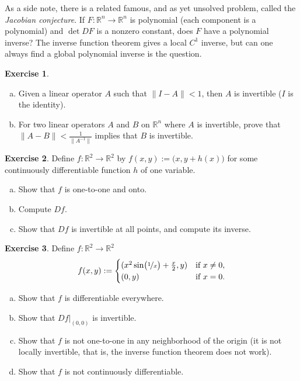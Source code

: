 \documentclass[12pt,openany]{book}
\newcommand{\snorm}[1]{\lVert {#1} \rVert}
\newcommand{\R}{{\mathbb{R}}}
\newcommand{\myindex}[1]{#1\index{#1}}
\theoremstyle{plain}
\theoremstyle{remark}
\theoremstyle{definition}
\newenvironment{exbox}{%
    \def\FrameCommand{\vrule width 1pt \relax\hspace {10pt}}%
    \MakeFramed {\advance \hsize -\width \FrameRestore }%
}{%
    \endMakeFramed
}
\newenvironment{exparts}{%
    \leavevmode\begin{enumerate}[a),noitemsep,topsep=0pt,parsep=0pt,partopsep=0pt]
}{%
    \end{enumerate}
}
\theoremstyle{exercise}
\newtheorem{exercise}{Exercise}[section]
\theoremstyle{example}
\begin{document}
\medskip

As a side note, there is a related famous, and as yet unsolved problem,
called the \emph{\myindex{Jacobian conjecture}}.  If $F \colon \R^n \to
\R^n$ is polynomial (each component is a polynomial) and $\det DF$ is a nonzero
constant, does $F$ have a polynomial inverse?
The inverse function theorem gives a local $C^1$ inverse, but can one always
find a global polynomial inverse is the question.

\begin{exbox}
\begin{exercise}
\begin{exparts}
\item
Given a linear operator $A$ such that
$\snorm{I-A} < 1$, then $A$ is invertible ($I$ is the identity).
\item
For two linear operators $A$ and $B$ on $\R^n$ where $A$ is invertible,
prove that $\snorm{A-B} < \frac{1}{\snorm{A^{-1}}}$ implies that $B$ is
invertible.
\end{exparts}
\end{exercise}

\begin{exercise}
Define $f \colon \R^2 \to \R^2$ by $f(x,y) :=
\bigl(x,y+h(x)\bigr)$ for some continuously differentiable function $h$ of one
variable.
\begin{exparts}
\item
Show that $f$ is one-to-one and onto.
\item
Compute $Df$.
\item
Show that $Df$ is invertible at all points, and compute
its inverse.
\end{exparts}
\end{exercise}

\begin{exercise}
Define $f \colon \R^2 \to \R^2$
\begin{equation*}
f(x,y) :=
\begin{cases}
(x^2 \sin \bigl(\nicefrac{1}{x}\bigr) + \frac{x}{2} , y ) & \text{if } x \not= 0, \\
(0,y)                                                     & \text{if } x=0.
\end{cases}
\end{equation*}
\begin{exparts}
\item
Show that $f$ is differentiable everywhere.
\item
Show that $Df|_{(0,0)}$ is invertible.
\item
Show that $f$ is not one-to-one in any neighborhood of the origin (it is
not locally invertible, that is, the inverse function theorem does not work).
\item
Show that $f$ is not continuously differentiable.
\end{exparts}
\end{exercise}


\end{exbox}
\end{document}
